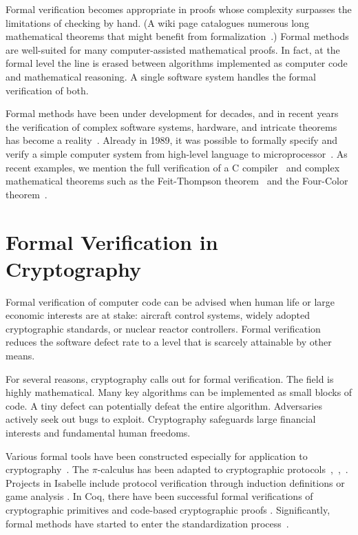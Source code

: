 \documentclass[11pt]{amsart} %
\begin{document}
Formal verification becomes appropriate in proofs whose complexity surpasses the limitations of checking by hand.
(A wiki page catalogues numerous long mathematical theorems that might benefit
from formalization~\cite{WikiLong}.)  
Formal methods are well-suited for many computer-assisted mathematical proofs.  
In fact, at the formal level the line is erased between algorithms implemented as computer code
and mathematical reasoning.  A single software system
 handles  the formal verification of both.  

Formal methods have been under development for decades, and in recent years the verification
of complex software systems, hardware, and intricate theorems has become a reality~\cite{FVI}.  
Already in 1989, it was possible to formally specify and verify a simple computer system from high-level language
to microprocessor~\cite{BHMY}.  As recent examples, 
we mention the full
verification of a C compiler~\cite{CC-Web}
and complex mathematical theorems such as the Feit-Thompson theorem~\cite{OOT-13} and the Four-Color theorem~\cite{gonthier:2008:formal}.


\section{Formal Verification in Cryptography}

Formal verification of computer code can be advised when
human life or large economic interests are at stake:   
aircraft control systems, widely adopted cryptographic standards, or nuclear reactor controllers.
Formal verification reduces the software defect rate to a level that is
scarcely attainable by other means.

For several reasons,  cryptography calls out for formal verification.
The field is highly mathematical.  Many key algorithms can be implemented as
small blocks of code.  A tiny defect can potentially defeat the entire algorithm.
Adversaries actively seek out bugs to exploit.
Cryptography safeguards
large financial interests and fundamental human freedoms.

Various formal tools have been constructed especially for application to cryptography~\cite{MPRI-Notes}.
The $\pi$-calculus 
has been adapted to cryptographic protocols~\cite{AF},~\cite{SPI},~\cite{RM99}.
Projects in Isabelle include protocol verification through induction definitions \cite{Pau-ind} or game analysis \cite{Berg-thesis}. In Coq,
there have been successful 
formal verifications of cryptographic primitives \cite{Nowak} and code-based cryptographic proofs \cite{Barthe-2009}.
Significantly, formal methods have started to enter the standardization process~\cite{Meadows}.
\end{document}
